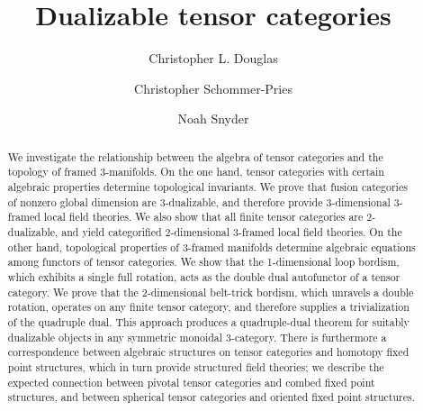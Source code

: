 \documentclass{amsart}
\begin{document}
\title{Dualizable tensor categories}

\begin{abstract}
We investigate the relationship between the algebra of tensor categories and the topology of framed 3-manifolds.  On the one hand, tensor categories with certain algebraic properties determine topological invariants.  We prove that fusion categories of nonzero global dimension are 3-dualizable, and therefore provide 3-dimensional 3-framed local field theories.  We also show that all finite tensor categories are 2-dualizable, and yield categorified 2-dimensional 3-framed local field theories.  On the other hand, topological properties of 3-framed manifolds determine algebraic equations among functors of tensor categories.  We show that the 1-dimensional loop bordism, which exhibits a single full rotation, acts as the double dual autofunctor of a tensor category.  We prove that the 2-dimensional belt-trick bordism, which unravels a double rotation, operates on any finite tensor category, and therefore supplies a trivialization of the quadruple dual.  This approach produces a quadruple-dual theorem for suitably dualizable objects in any symmetric monoidal 3-category.  There is furthermore a correspondence between algebraic structures on tensor categories and homotopy fixed point structures, which in turn provide structured field theories; we describe the expected connection between pivotal tensor categories and combed fixed point structures, and between spherical tensor categories and oriented fixed point structures.
\end{abstract}

\author{Christopher L. Douglas}
\address{Mathematical Institute\\ University of Oxford\\ Oxford OX2 6GG\\ United Kingdom}
      	
\author{Christopher Schommer-Pries}
\address{Department of Mathematics\\ Max Planck Institute for Mathematics \\ 53111 Bonn \\ Germany}

\author{Noah Snyder}
\address{Department of Mathematics\\ Indiana University\\ Bloomington, IN 47401\\ USA}
\end{document}
